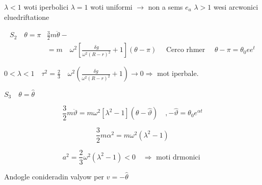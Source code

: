 \documentclass[10pt]{article}
\begin{document}
\(\lambda<1\) woti iperbolici \(\lambda=1\) woti uniformi \(\rightarrow\) non a sems \(e_{a}\) \(\lambda>1\) wesi arcwonici eluedriftatione

\[
\begin{aligned}
S_{2} \quad \theta=\pi & \frac{3}{2} m \ddot{\theta}- \\
& =m \quad \omega^{2}\left[\frac{\delta g}{\omega^{2}(R-r)^{2}}+1\right](\theta-\pi) \quad \text { Cerco rhmer } \quad \theta-\pi=\theta_{0} e e^{t}
\end{aligned}
\]

\(0<\lambda<1 \quad \tau^{2}=\frac{2}{3} \quad \omega^{2}\left(\frac{\delta g}{\omega^{2}(R-r)^{2}}+1\right) \rightarrow 0 \Rightarrow\) mot iperbale.

\(S_{3} \quad \theta=\hat{\theta}\)

\[
\frac{3}{2} m \ddot{\vartheta}=m \omega^{2}\left[\lambda^{2}-1\right](\theta-\hat{\vartheta}) \quad,-\hat{\vartheta}=\theta_{0} e^{\alpha t}
\]

\[
\frac{3}{2} m \alpha^{2}=m \omega^{2}\left(\lambda^{2}-1\right)
\]

\[
a^{2}=\frac{2}{3} \omega^{2}\left(\lambda^{2}-1\right)<0 \quad \Rightarrow \text { moti drmonici }
\]

Andogle conideradin valyow per \(v=-\hat{\theta}\)
\end{document}
